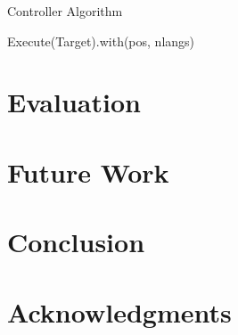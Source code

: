 \documentclass[11pt]{article}
\begin{document}
\begin{algorithm}
\caption{Controller Algorithm}
\label{Special Edition}
\begin{algorithmic}[2]
	\State Execute(Target).with(pos, nlangs)
\EndProcedure
\end{algorithmic}
\end{algorithm}


\section{Evaluation}

\section{Future Work}

\section{Conclusion}

\section*{Acknowledgments}




\end{document}
